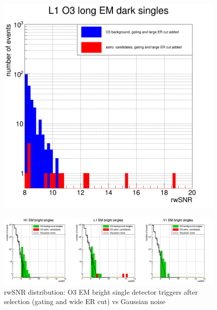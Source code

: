 \begin{figure}
\begin{minipage}{0.45\linewidth}
    \label{fig:emdark_cutGating}
  \end{minipage}
  \hfill
  \begin{minipage}{0.45\linewidth}
    \centering
    \includegraphics[width=\linewidth]{sectionSelection/plotsEMdark/cL1_O3_afterCutMoreER.png}
    \label{fig:emdark_cutMoreER}
  \end{minipage}
  \hfill
\end{figure}
% 
% 
\begin{figure}
  \centering
  \includegraphics[width=\textwidth]{sectionSelection/plotsEMbright/cPosterAllCut.png}
  \caption{rwSNR distribution: O3 EM bright single detector triggers after selection (gating and wide ER cut) vs Gaussian noise}
  \label{fig:compare_bright_gaus_selec}
\end{figure}
